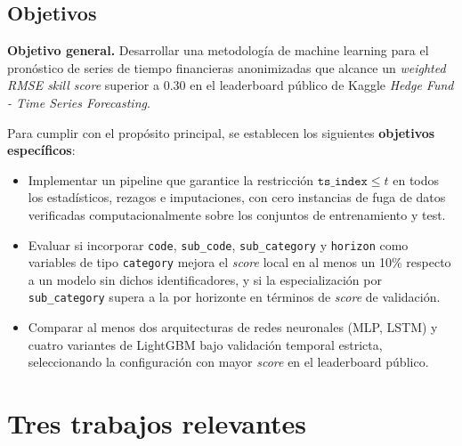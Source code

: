 \documentclass{article}
\begin{document}
\subsection{Objetivos}

\textbf{Objetivo general.} Desarrollar una metodología de machine learning para el pronóstico de series de tiempo financieras anonimizadas que alcance un \emph{weighted RMSE skill score} superior a 0.30 en el leaderboard público de Kaggle \emph{Hedge Fund - Time Series Forecasting}.

Para cumplir con el propósito principal, se establecen los siguientes \textbf{objetivos específicos}:

\begin{itemize}
    \item Implementar un pipeline que garantice la restricción $\texttt{ts\_index} \leq t$ en todos los estadísticos, rezagos e imputaciones, con cero instancias de fuga de datos verificadas computacionalmente sobre los conjuntos de entrenamiento y test.
    \item Evaluar si incorporar \texttt{code}, \texttt{sub\_code}, \texttt{sub\_category} y \texttt{horizon} como variables de tipo \texttt{category} mejora el \emph{score} local en al menos un 10\% respecto a un modelo sin dichos identificadores, y si la especialización por \texttt{sub\_category} supera a la por horizonte en términos de \emph{score} de validación.
    \item Comparar al menos dos arquitecturas de redes neuronales (MLP, LSTM) y cuatro variantes de LightGBM bajo validación temporal estricta, seleccionando la configuración con mayor \emph{score} en el leaderboard público.
\end{itemize}



\section{Tres trabajos relevantes}
\end{document}
